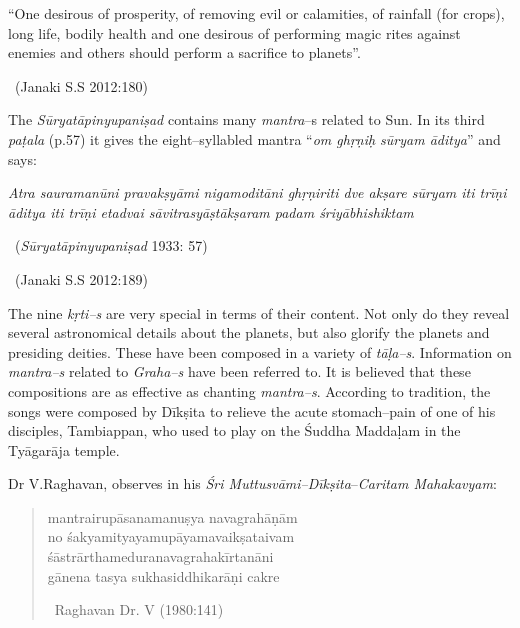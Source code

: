 \begin{myquote}
“One desirous of prosperity, of removing evil or calamities, of rainfall (for crops), long life, bodily health and one desirous of performing magic rites against enemies and others should perform a sacrifice to planets”.

~\hfill (Janaki S.S 2012:180)
\end{myquote}

The \textit{Sūryatāpinyupaniṣad} contains many \textit{mantra}–s related to Sun. In its third \textit{paṭala} (p.57) it gives the eight–syllabled mantra “\textit{om ghṛṇiḥ sūryam āditya}” and says:

\begin{myquote}
\textit{Atra sauramanūni pravakṣyāmi nigamoditāni  ghṛṇiriti dve akṣare  sūryam iti trīṇi  āditya iti trīṇi  etadvai sāvitrasyāṣtākṣaram padam śriyābhishiktam } 

~\hfill (\textit{Sūryatāpinyupaniṣad} 1933: 57)
\end{myquote}

\vspace{-.1cm}

\begin{myquote}

~\hfill (Janaki S.S 2012:189)
\end{myquote}

The nine \textit{kṛti–s} are very special in terms of their content. Not only do they reveal several astronomical details about the planets, but also glorify the planets and presiding deities. These have been composed in a variety of \textit{tāḷa–s}. Information on \textit{mantra–s} related to \textit{Graha–s} have been referred to. It is believed that these compositions are as effective as chanting \textit{mantra–s}. According to tradition, the songs were composed by Dīkṣita to relieve the acute stomach–pain of one of his disciples, Tambiappan, who used to play on the Śuddha Maddaḷam in the Tyāgarāja temple.

Dr V.Raghavan, observes in his \textit{Śri Muttusvāmi–Dīkṣita}–\textit{Caritam Maha\-kavyam}:

\vspace{-.2cm}

\begin{verse}
mantrairupāsanamanuṣya navagrahāṇām\\ no śakyamityayamupāyamavaikṣataivam \\ śāstrārthameduranavagrahakīrtanāni\\ gānena tasya sukhasiddhikarāṇi cakre  

~\hfill Raghavan Dr. V (1980:141)
\end{verse}

